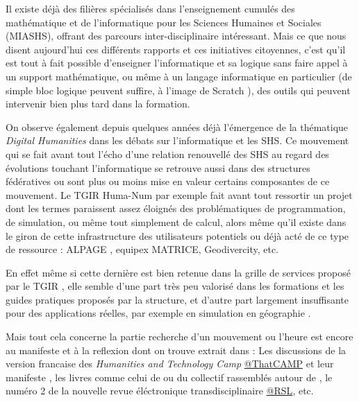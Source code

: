 Il existe déjà des filières spécialisés dans l'enseignement cumulés des mathématique et de l'informatique pour les Sciences Humaines et Sociales (MIASHS), offrant des parcours inter-disciplinaire intéressant. Mais ce que nous disent aujourd'hui ces différents rapports et ces initiatives citoyennes, c'est qu'il est tout à fait possible d'enseigner l'informatique et sa logique sans faire appel à un support mathématique, ou même à un langage informatique en particulier (de simple bloc logique peuvent suffire, à l'image de Scratch \autocite{Resnick2009}), des outils qui peuvent intervenir bien plus tard dans la formation.

On observe également depuis quelques années déjà l'émergence de la thématique \textit{Digital Humanities} dans les débats sur l'informatique et les SHS. Ce mouvement  qui se fait avant tout l'écho d'une relation renouvellé des SHS au regard des évolutions touchant l'informatique  se retrouve aussi dans des structures fédératives ou sont plus ou moins mise en valeur certains composantes de ce mouvement. Le TGIR Huma-Num par exemple fait avant tout ressortir un projet dont les termes  paraissent assez éloignés des problématiques de programmation, de simulation, ou même tout simplement de calcul, alors même qu'il existe dans le giron de cette infrastructure des utilisateurs potentiels ou déjà acté de ce type de ressource : ALPAGE \autocite{Costa2012}, equipex MATRICE, Geodivercity, etc.

En effet même si cette dernière est bien retenue dans la grille de services proposé par le TGIR , elle semble d'une part très peu valorisé dans les formations et les guides pratiques proposés par la structure, et d'autre part largement insuffisante pour des applications réelles, par exemple en simulation en géographie .

Mais tout cela concerne la partie recherche d'un mouvement ou l'heure est encore au manifeste et à la reflexion dont on trouve extrait dans : Les discussions de la version francaise des \textit{Humanities and Technology Camp} \href{http://tcp.hypotheses.org/}{@ThatCAMP} et leur manifeste \autocite{THATCamp2010}, les livres comme celui de \textcite{Deuff2014} ou du collectif rassemblés autour de \textcite{Mounier2012}, le numéro 2 de la nouvelle revue éléctronique transdisciplinaire \href{http://rsl.revues.org/355}{@RSL}, etc.

